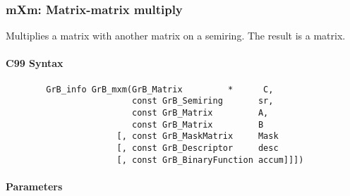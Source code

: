 \subsubsection{{\sf mXm}: Matrix-matrix multiply}

Multiplies a matrix with another matrix on a semiring. The result is a matrix.

\paragraph{C99 Syntax}

\begin{verbatim}
        GrB_info GrB_mxm(GrB_Matrix         *      C,
                         const GrB_Semiring       sr,
                         const GrB_Matrix         A, 
                         const GrB_Matrix         B
                      [, const GrB_MaskMatrix     Mask
                      [, const GrB_Descriptor     desc
                      [, const GrB_BinaryFunction accum]]])
\end{verbatim}



\paragraph{Parameters}

